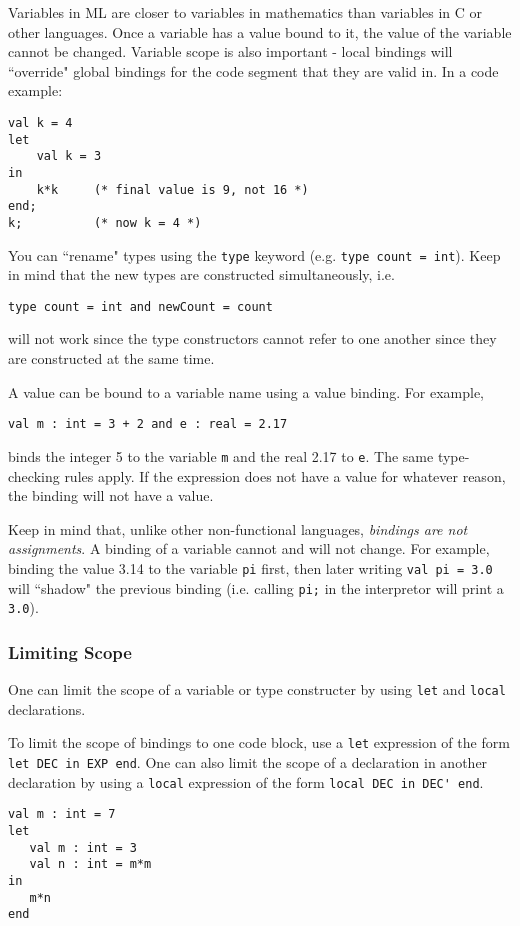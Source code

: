 \documentclass[11pt]{article}
\begin{document}
Variables in ML are closer to variables in mathematics than variables in C or other languages. Once a variable has a value bound to it, the value of the variable cannot be changed. Variable scope is also important - local bindings will ``override" global bindings for the code segment that they are valid in. In a code example:

\begin{verbatim}
val k = 4
let
	val k = 3
in
	k*k		(* final value is 9, not 16 *)
end;
k;			(* now k = 4 *)
\end{verbatim}

You can ``rename" types using the \verb~type~ keyword (e.g. \verb~type count = int~). Keep in mind that the new types are constructed simultaneously, i.e. 

\verb~type count = int and newCount = count~ 

will not work since the type constructors cannot refer to one another since they are constructed at the same time.

A value can be bound to a variable name using a value binding. For example, 

\verb~val m : int = 3 + 2 and e : real = 2.17~ 

binds the integer 5 to the variable \verb~m~ and the real 2.17 to \verb~e~. The same type-checking rules apply. If the expression does not have a value for whatever reason, the binding will not have a value.

Keep in mind that, unlike other non-functional languages, \emph{bindings are not assignments}. A binding of a variable cannot and will not change. For example, binding the value 3.14 to the variable \verb~pi~ first, then later writing \verb~val pi = 3.0~ will ``shadow" the previous binding (i.e. calling \verb~pi;~ in the interpretor will print a \verb~3.0~).

\subsubsection{Limiting Scope}

One can limit the scope of a variable or type constructer by using \verb~let~ and \verb~local~ declarations.

To limit the scope of bindings to one code block, use a \verb~let~ expression of the form \verb~let DEC in EXP end~. One can also limit the scope of a declaration in another declaration by using a \verb~local~ expression of the form \verb~local DEC in DEC' end~.

\begin{verbatim}
val m : int = 7
let
   val m : int = 3
   val n : int = m*m
in
   m*n
end
\end{verbatim}
\end{document}

